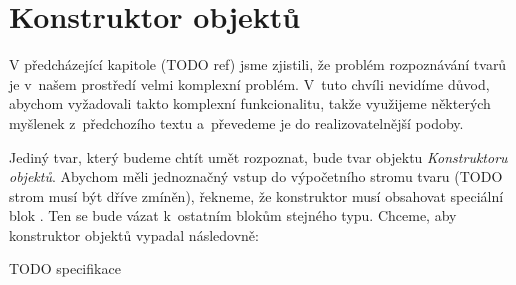 
\section{Konstruktor objektů}
\label{sec:konstruktor}


V předcházející kapitole (TODO ref) jsme zjistili, že problém rozpoznávání tvarů je v~našem prostředí velmi komplexní problém. V~tuto chvíli nevidíme důvod, abychom vyžadovali takto komplexní funkcionalitu, takže využijeme některých myšlenek z~předchozího textu a~převedeme je do realizovatelnější podoby.

Jediný tvar, který budeme chtít umět rozpoznat, bude tvar objektu \textit{Konstruktoru objektů}. Abychom měli jednoznačný vstup do výpočetního stromu tvaru (TODO strom musí být dříve zmíněn), řekneme, že konstruktor musí obsahovat speciální blok . Ten se bude vázat k~ostatním blokům stejného typu. Chceme, aby konstruktor objektů vypadal následovně:

TODO specifikace

